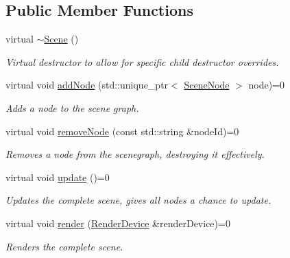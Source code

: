 \subsection*{Public Member Functions}
\begin{DoxyCompactItemize}
\item 
\mbox{\label{class_scene_a3b8cec2e32546713915f8c6303c951f1}} 
virtual \hyperlink{class_scene_a3b8cec2e32546713915f8c6303c951f1}{$\sim$\+Scene} ()
\begin{DoxyCompactList}\small\item\em Virtual destructor to allow for specific child destructor overrides. \end{DoxyCompactList}\item 
\mbox{\label{class_scene_adcf11ea10fab6c9371fd5bfbf3d08107}} 
virtual void \hyperlink{class_scene_adcf11ea10fab6c9371fd5bfbf3d08107}{add\+Node} (std\+::unique\+\_\+ptr$<$ \hyperlink{class_scene_node}{Scene\+Node} $>$ node)=0
\begin{DoxyCompactList}\small\item\em Adds a node to the scene graph. \end{DoxyCompactList}\item 
\mbox{\label{class_scene_a54956adf423ce5469d3928ab26da987b}} 
virtual void \hyperlink{class_scene_a54956adf423ce5469d3928ab26da987b}{remove\+Node} (const std\+::string \&node\+Id)=0
\begin{DoxyCompactList}\small\item\em Removes a node from the scenegraph, destroying it effectively. \end{DoxyCompactList}\item 
\mbox{\label{class_scene_a7faff47f5c1b1ebc986f768c9b9732ec}} 
virtual void \hyperlink{class_scene_a7faff47f5c1b1ebc986f768c9b9732ec}{update} ()=0
\begin{DoxyCompactList}\small\item\em Updates the complete scene, gives all nodes a chance to update. \end{DoxyCompactList}\item 
\mbox{\label{class_scene_a3eba6b8bf7e5be1ae0809f6f3ded3585}} 
virtual void \hyperlink{class_scene_a3eba6b8bf7e5be1ae0809f6f3ded3585}{render} (\hyperlink{class_render_device}{Render\+Device} \&render\+Device)=0
\begin{DoxyCompactList}\small\item\em Renders the complete scene. \end{DoxyCompactList}\end{DoxyCompactItemize}


